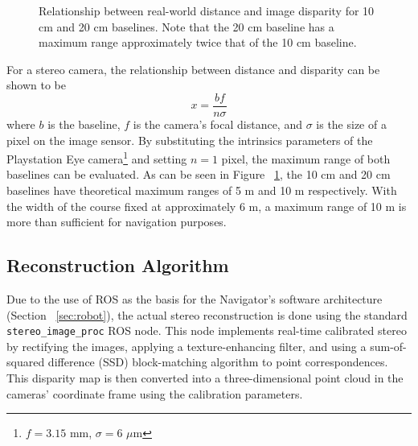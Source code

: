 \documentclass[11pt,twocolumn]{article}
\begin{document}
\begin{figure*}
	\centering
	\caption{
		Effect of baseline multiplexing on maximum stereo range. Note that the
		narrow baseline has both a shorter dead range and maximum range than
		the wide disparity map. The multiplexed point cloud combines the
		strengths of both baselines.
	}
	\label{fig:stereo-example}
\end{figure*}

\begin{figure}
	\caption{
		Relationship between real-world distance and image disparity for
		10 cm and 20 cm baselines. Note that the 20 cm baseline has a maximum
		range approximately twice that of the 10 cm baseline.
	}
	\label{fig:stereo-dist-disparity}
\end{figure}

For a stereo camera, the relationship between distance and disparity can be
shown to be
\begin{equation*}
	x = \frac{bf}{n\sigma}
\end{equation*}
where $b$ is the baseline, $f$ is the camera's focal distance, and $\sigma$ is
the size of a pixel on the image sensor. By substituting the intrinsics
parameters of the Playstation Eye camera\footnote{$f = 3.15$ mm, $\sigma = 6$
$\mu$m} and setting $n = 1$ pixel, the maximum range of both baselines can be
evaluated. As can be seen in Figure ~\ref{fig:stereo-dist-disparity}, the 10 cm
and 20 cm baselines have theoretical maximum ranges of 5 m and 10 m
respectively. With the width of the course fixed at approximately 6 m, a
maximum range of 10 m is more than sufficient for navigation purposes.

\subsection{Reconstruction Algorithm}
\label{sec:stereo-correspond}
Due to the use of ROS as the basis for the Navigator's software architecture
(Section ~\ref{sec:robot}), the actual stereo reconstruction is done using the
standard \texttt{stereo\_image\_proc} ROS node. This node implements real-time
calibrated stereo by rectifying the images, applying a texture-enhancing
filter, and using a sum-of-squared difference (SSD) block-matching algorithm to
point correspondences. This disparity map is then converted into a
three-dimensional point cloud in the cameras' coordinate frame using the
calibration parameters.
\end{document}
